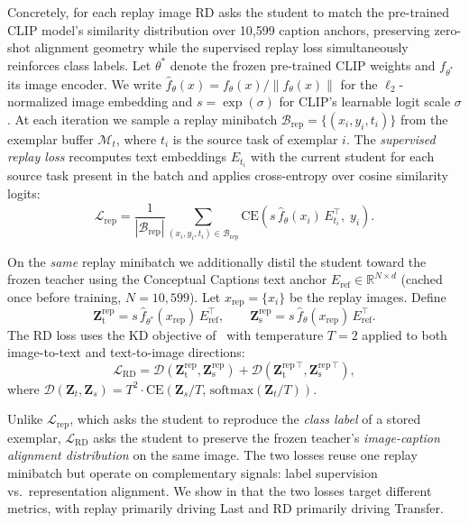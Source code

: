 \documentclass{article}
\begin{document}
  Concretely, for each replay image RD asks the student to match the pre-trained CLIP model's similarity distribution over 10,599 caption anchors, preserving zero-shot alignment geometry while the supervised replay loss simultaneously reinforces class labels. Let $\theta^*$ denote the frozen pre-trained CLIP weights and $f_{\theta^*}$ its image encoder. We write $\hat{f}_\theta(x) = f_\theta(x)/\|f_\theta(x)\|$ for the $\ell_2$-normalized image embedding and $s = \exp(\sigma)$ for CLIP's
  learnable logit scale $\sigma$. At each iteration we sample a replay minibatch
  $\mathcal{B}_{\text{rep}} = \{(x_i, y_i, t_i)\}$ from the exemplar buffer
  $\mathcal{M}_t$, where $t_i$ is the source task of exemplar $i$. The
  \emph{supervised replay loss} recomputes text embeddings $E_{t_i}$ with the
  current student for each source task present in the batch and applies
  cross-entropy over cosine similarity logits:
  \begin{equation}
    \mathcal{L}_{\text{rep}} = \frac{1}{|\mathcal{B}_{\text{rep}}|}
      \sum_{(x_i, y_i, t_i) \in \mathcal{B}_{\text{rep}}}
      \mathrm{CE}\!\left(s\,\hat{f}_{\theta}(x_i)\,E_{t_i}^\top,\; y_i\right).
  \end{equation}

  On the \emph{same} replay minibatch we additionally distil the student toward the
  frozen teacher using the Conceptual Captions text anchor
  $E_{\text{ref}} \in \mathbb{R}^{N \times d}$ (cached once before training,
  $N{=}10{,}599$). Let $x_{\text{rep}} = \{x_i\}$ be the replay images. Define
  \begin{equation}
    \mathbf{Z}^{\text{rep}}_\text{t} =
      s\,\hat{f}_{\theta^*}(x_{\text{rep}})\,E_{\text{ref}}^\top,
    \qquad
    \mathbf{Z}^{\text{rep}}_\text{s} =
      s\,\hat{f}_{\theta}(x_{\text{rep}})\,E_{\text{ref}}^\top.
  \end{equation}
  The RD loss uses the KD objective of~\citet{zheng2023zscl} with
  temperature $T{=}2$ applied to both image-to-text and text-to-image directions:
  \begin{equation}
    \mathcal{L}_{\text{RD}} =
      \mathcal{D}(\mathbf{Z}^{\text{rep}}_\text{t}, \mathbf{Z}^{\text{rep}}_\text{s})
    + \mathcal{D}(\mathbf{Z}^{\text{rep}\,\top}_\text{t}, \mathbf{Z}^{\text{rep}\,\top}_\text{s}),
    \label{eq:rd}
  \end{equation}
  where $\mathcal{D}(\mathbf{Z}_t, \mathbf{Z}_s) = T^2 \cdot
  \mathrm{CE}(\mathbf{Z}_s / T,\, \mathrm{softmax}(\mathbf{Z}_t / T))$.

  Unlike $\mathcal{L}_{\text{rep}}$, which asks the student to reproduce the
  \emph{class label} of a stored exemplar, $\mathcal{L}_{\text{RD}}$ asks the
  student to preserve the frozen teacher's \emph{image-caption alignment
  distribution} on the same image. The two losses reuse one replay minibatch but
  operate on complementary signals: label supervision vs.\ representation
  alignment. We show in  that the two losses target different
  metrics, with replay primarily driving Last and RD primarily driving Transfer.
\end{document}
